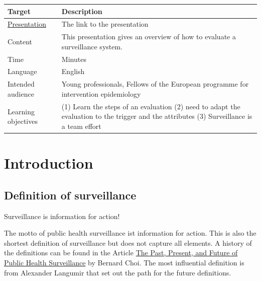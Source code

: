 \documentclass[
  letterpaper,
  DIV=11,
  numbers=noendperiod]{scrreprt}
\begin{document}
\begin{longtable}[]{@{}
  >{\raggedright\arraybackslash}p{}
  >{\raggedright\arraybackslash}p{}@{}}
\toprule\noalign{}
\begin{minipage}[b]{\linewidth}\raggedright
Target
\end{minipage} & \begin{minipage}[b]{\linewidth}\raggedright
Description
\end{minipage} \\
\midrule\noalign{}
\endhead
\bottomrule\noalign{}
\endlastfoot
\href{1_Presentations/presentation_evaluation.html}{Presentation} & The
link to the presentation \\
Content & This presentation gives an overview of how to evaluate a
surveillance system. \\
Time & 10 Minutes \\
Language & English \\
Intended audience & Young professionals, Fellows of the European
programme for intervention epidemiology \\
Learning objectives & (1) Learn the steps of an evaluation (2) need to
adapt the evaluation to the trigger and the attributes (3) Surveillance
is a team effort \\
\end{longtable}

\part{Introduction}

\chapter{Definition of surveillance}\label{definition-of-surveillance}

Surveillance is information for action!

\hfill\break

The motto of public health surveillance ist information for action. This
is also the shortest definition of surveillance but does not capture all
elements. A history of the definitions can be found in the Article
\href{https://www.ncbi.nlm.nih.gov/pmc/articles/PMC3820481/table/tab5/}{The
Past, Present, and Future of Public Health Surveillance} by Bernard
Choi. The most influential definition is from Alexander Langumir that
set out the path for the future definitions.
\end{document}
